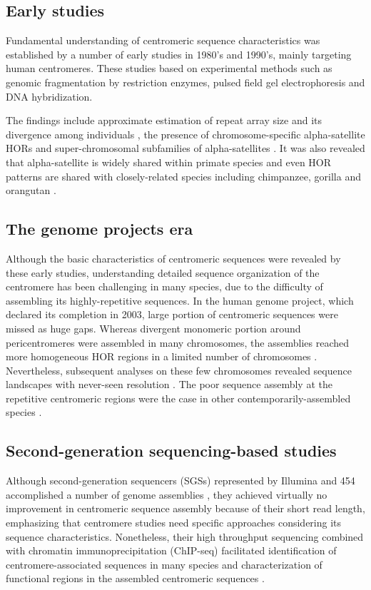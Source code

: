 \subsection*{Early studies}
  Fundamental understanding of centromeric sequence characteristics was established by a number of early studies in 1980's and 1990's, mainly targeting human centromeres. These studies based on experimental methods such as genomic fragmentation by restriction enzymes, pulsed field gel electrophoresis and DNA hybridization.

  The findings include approximate estimation of repeat array size and its divergence among individuals \cite{Oakey1990, Mahtani1990, Greig1991}, the presence of chromosome-specific alpha-satellite HORs \cite{Willard1987} and super-chromosomal subfamilies of alpha-satellites \cite{Alexandrov1988, Alexandrov2001}. It was also revealed that alpha-satellite is widely shared within primate species and even HOR patterns are shared with closely-related species including chimpanzee, gorilla and orangutan \cite{Willard1991}.


\subsection*{The genome projects era}
  Although the basic characteristics of centromeric sequences were revealed by these early studies, understanding detailed sequence organization of the centromere has been challenging in many species, due to the difficulty of assembling its highly-repetitive sequences. In the human genome project, which declared its completion in 2003, large portion of centromeric sequences were missed as huge gaps. Whereas divergent monomeric portion around pericentromeres were assembled in many chromosomes, the assemblies reached more homogeneous HOR regions in a limited number of chromosomes \cite{M.KatharineRuddand2004, She2004}. Nevertheless, subsequent analyses on these few chromosomes revealed sequence landscapes with never-seen resolution \cite{Schueler2001, Ross2005, Nusbaum2006, Rudd2006}. The poor sequence assembly at the repetitive centromeric regions were the case in other contemporarily-assembled species \cite {Waterston2002, Hoskins2007}.


\subsection*{Second-generation sequencing-based studies}
  Although second-generation sequencers (SGSs) represented by Illumina and 454 accomplished a number of genome assemblies \cite{Schatz2010}, they achieved virtually no improvement in centromeric sequence assembly because of their short read length, emphasizing that centromere studies need specific approaches considering its sequence characteristics. Nonetheless, their high throughput sequencing combined with chromatin immunoprecipitation (ChIP-seq) facilitated identification of centromere-associated sequences in many species \cite{} and characterization of functional regions in the assembled centromeric sequences \cite{Hayden2013}.


